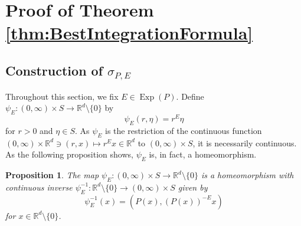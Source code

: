 \documentclass[11pt]{article}
\newtheorem{proposition}[theorem]{Proposition}
\theoremstyle{remark}
\newcommand\Exp{\operatorname{Exp}}
\begin{document}






\section{Proof of Theorem \ref{thm:BestIntegrationFormula}}\label{sec:ProofofBest}



\subsection{Construction of $\sigma_{P,E}$}\label{subsec:ConstructionofSigma}

Throughout this section, we fix $E\in\Exp(P)$. Define $\psi_E:(0,\infty)\times S\to\mathbb{R}^d\setminus\{0\}$ by
\begin{equation}\label{eq:Homeomorphism}
\psi_E(r,\eta)=r^E\eta
\end{equation}
for $r>0$ and $\eta\in S$. As $\psi_E$ is the restriction of the continuous function $(0,\infty)\times \mathbb{R}^d\ni (r,x)\mapsto r^E x\in\mathbb{R}^d$ to $(0,\infty)\times S$, it is necessarily continuous. As the following proposition shows, $\psi_E$ is, in fact, a homeomorphism.

\begin{proposition}\label{prop:PsiHomeomorphism}
The map $\psi_E:(0,\infty)\times S\to\mathbb{R}^d\setminus\{0\}$ is a homeomorphism with continuous inverse $\psi_E^{-1}:\mathbb{R}^d\setminus\{0\}\to (0,\infty)\times S$ given by
\begin{equation*}
\psi_E^{-1}(x)=(P(x),(P(x))^{-E}x)
\end{equation*}
for $x\in\mathbb{R}^d\setminus\{0\}$.
\end{proposition}
\end{document}
